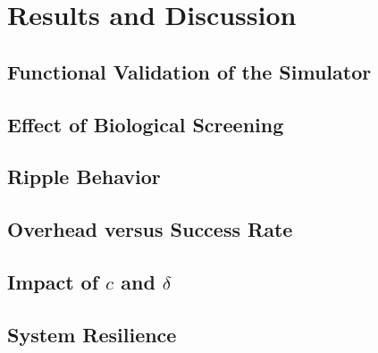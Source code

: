 \chapter{Results and Discussion}
\label{chap:results}

\section{Functional Validation of the Simulator}
\label{sec:results_functional_validation}

\section{Effect of Biological Screening}
\label{sec:results_biological_screening}

\section{Ripple Behavior}
\label{sec:results_ripple_behavior}

\section{Overhead versus Success Rate}
\label{sec:results_overhead_success_rate}

\section{Impact of $c$ and $\delta$}
\label{sec:results_impact_c_delta}

\section{System Resilience}
\label{sec:results_system_resilience}

